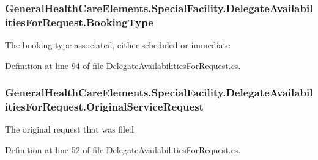 \subsubsection[{\texorpdfstring{Booking\+Type}{BookingType}}]{ General\+Health\+Care\+Elements.\+Special\+Facility.\+Delegate\+Availabilities\+For\+Request.\+Booking\+Type\hspace{0.3cm}{\ttfamily [get]}}\hypertarget{class_general_health_care_elements_1_1_special_facility_1_1_delegate_availabilities_for_request_a292782a7f13f112e87cf5fe53b51d82f}{}\label{class_general_health_care_elements_1_1_special_facility_1_1_delegate_availabilities_for_request_a292782a7f13f112e87cf5fe53b51d82f}


The booking type associated, either scheduled or immediate 



Definition at line 94 of file Delegate\+Availabilities\+For\+Request.\+cs.

\subsubsection[{\texorpdfstring{Original\+Service\+Request}{OriginalServiceRequest}}]{ General\+Health\+Care\+Elements.\+Special\+Facility.\+Delegate\+Availabilities\+For\+Request.\+Original\+Service\+Request\hspace{0.3cm}{\ttfamily [get]}}\hypertarget{class_general_health_care_elements_1_1_special_facility_1_1_delegate_availabilities_for_request_a35ce2e582876eac29e90b6933fdd660b}{}\label{class_general_health_care_elements_1_1_special_facility_1_1_delegate_availabilities_for_request_a35ce2e582876eac29e90b6933fdd660b}


The original request that was filed 



Definition at line 52 of file Delegate\+Availabilities\+For\+Request.\+cs.

